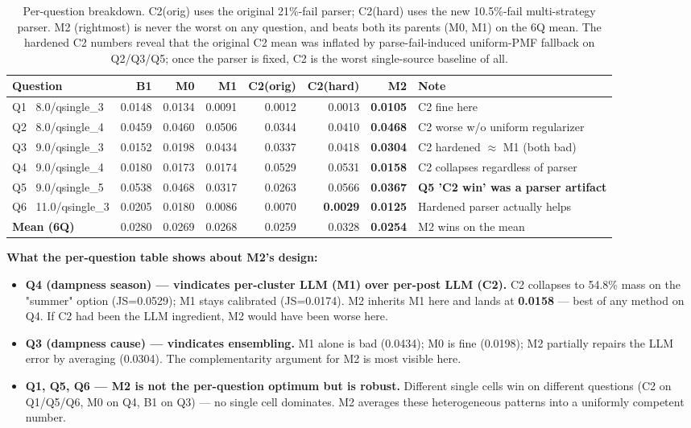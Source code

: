 \documentclass[10pt,a4paper]{article}
\newcommand{\good}[1]{\textcolor{green!50!black}{\textbf{#1}}}
\newcommand{\bad}[1]{\textcolor{red!60!black}{#1}}
\begin{document}
\begin{table}[H]
\centering
\small
\begin{tabular}{l r r r r r r l}
\toprule
\textbf{Question} & \textbf{B1} & \textbf{M0} & \textbf{M1} & \textbf{C2(orig)} & \textbf{C2(hard)} & \textbf{M2} & \textbf{Note} \\
\midrule
Q1 \ 8.0/qsingle\_3   & 0.0148 & 0.0134 & 0.0091 & 0.0012 & 0.0013 & \good{0.0105} & C2 fine here \\
Q2 \ 8.0/qsingle\_4   & 0.0459 & 0.0460 & 0.0506 & 0.0344 & \bad{0.0410} & \good{0.0468} & C2 worse w/o uniform regularizer \\
Q3 \ 9.0/qsingle\_3   & 0.0152 & 0.0198 & \bad{0.0434} & 0.0337 & \bad{0.0418} & \good{0.0304} & C2 hardened $\approx$ M1 (both bad) \\
Q4 \ 9.0/qsingle\_4   & 0.0180 & 0.0173 & 0.0174 & \bad{0.0529} & \bad{0.0531} & \good{0.0158} & C2 collapses regardless of parser \\
Q5 \ 9.0/qsingle\_5   & \bad{0.0538} & 0.0468 & 0.0317 & 0.0263 & \bad{0.0566} & \good{0.0367} & \textbf{Q5 'C2 win' was a parser artifact} \\
Q6 \ 11.0/qsingle\_3  & 0.0205 & 0.0180 & 0.0086 & 0.0070 & \good{0.0029} & \good{0.0125} & Hardened parser actually helps \\
\midrule
\textbf{Mean (6Q)}    & 0.0280 & 0.0269 & 0.0268 & 0.0259 & \bad{0.0328} & \good{0.0254} & M2 wins on the mean \\
\bottomrule
\end{tabular}
\caption{Per-question breakdown. C2(orig) uses the original 21\%-fail parser; C2(hard) uses the new 10.5\%-fail multi-strategy parser. M2 (rightmost) is never the worst on any question, and beats both its parents (M0, M1) on the 6Q mean. The hardened C2 numbers reveal that the original C2 mean was inflated by parse-fail-induced uniform-PMF fallback on Q2/Q3/Q5; once the parser is fixed, C2 is the worst single-source baseline of all.}
\end{table}

\textbf{What the per-question table shows about M2's design:}

\begin{itemize}[leftmargin=*,itemsep=0pt]
    \item \textbf{Q4 (dampness season) — vindicates per-cluster LLM (M1) over per-post LLM (C2).} C2 collapses to 54.8\% mass on the "summer" option (JS=0.0529); M1 stays calibrated (JS=0.0174). M2 inherits M1 here and lands at \good{0.0158} — best of any method on Q4. If C2 had been the LLM ingredient, M2 would have been worse here.
    \item \textbf{Q3 (dampness cause) — vindicates ensembling.} M1 alone is bad (0.0434); M0 is fine (0.0198); M2 partially repairs the LLM error by averaging (0.0304). The complementarity argument for M2 is most visible here.
    \item \textbf{Q1, Q5, Q6 — M2 is not the per-question optimum but is robust.} Different single cells win on different questions (C2 on Q1/Q5/Q6, M0 on Q4, B1 on Q3) — no single cell dominates. M2 averages these heterogeneous patterns into a uniformly competent number.
\end{itemize}
\end{document}
